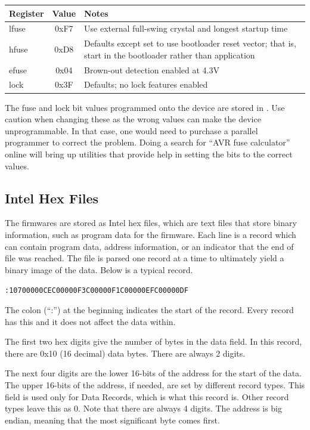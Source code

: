 \documentclass{article}
\begin{document}
\begin{center}
    \begin{tabular}{l|c|p{}}
        Register & Value & Notes \\
        \hline
        lfuse & 0xF7 & Use external full-swing crystal and longest startup time \\
        hfuse & 0xD8 & Defaults except set to use bootloader reset vector; that is, start in the
        bootloader rather than application \\
        efuse & 0x04 & Brown-out detection enabled at 4.3V \\
        lock  & 0x3F & Defaults; no lock features enabled \\
    \end{tabular}
\end{center}

The fuse and lock bit values programmed onto the device are stored in
.  Use caution when changing these as the wrong values can
make the device unprogrammable.  In that case, one would need to purchase a parallel programmer to
correct the problem.  Doing a search for ``AVR fuse calculator'' online will bring up utilities that
provide help in setting the bits to the correct values.

\subsection{Intel Hex Files} \label{ssec:FWIntelHex}
The firmwares are stored as Intel hex files, which are text files that store binary information,
such as program data for the firmware.  Each line is a record which can contain program data, 
address information, or an indicator that the end of file was reached.  The file is parsed one
record at a time to ultimately yield a binary image of the data.  Below is a typical record.

\texttt{:10700000CEC00000F3C00000F1C00000EFC00000DF}

The colon (``:'') at the beginning indicates the start of the record.  Every record has this and it
does not affect the data within.

The first two hex digits give the number of bytes in the data field.  In this record, there are 0x10
(16 decimal) data bytes.  There are always 2 digits.

The next four digits are the lower 16-bits of the address for the start of the data.  The upper
16-bits of the address, if needed, are set by different record types.  This field is used only for
Data Records, which is what this record is.  Other record types leave this as 0.  Note that there
are always 4 digits.  The address is big endian, meaning that the most significant byte comes first.
\end{document}
